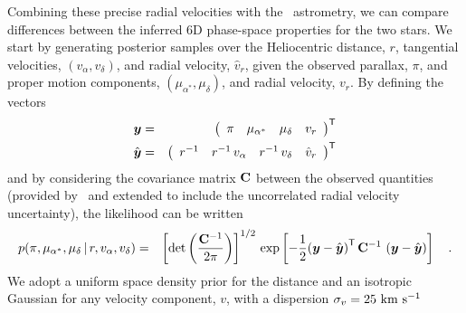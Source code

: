 \documentclass[12pt,letterpaper]{article}
\newcommand{\gaia}{\project{Gaia}}
\newcommand{\tgas}{\acronym{TGAS}}
\begin{document}
Combining these precise radial velocities with the \gaia\ astrometry, we can
compare differences between the inferred 6D phase-space properties for the
two stars.
We start by generating posterior samples over the Heliocentric distance, $r$,
tangential velocities, $(v_\alpha, v_\delta)$, and radial velocity, $\hat{v}_r$,
given the observed parallax, $\pi$, and proper motion components,
$(\mu_{\alpha^*}, \mu_\delta)$, and radial velocity, $v_r$.
By defining the vectors
\begin{eqnarray}
  \vec{y} &=&
      \transpose{\left(
        \begin{array}{c@{\hspace{1em}} c@{\hspace{1em}} c@{\hspace{1em}} c}
          \pi &
          \mu_{\alpha^*} &
          \mu_\delta &
          v_r
        \end{array}
      \right)}\\
  \hat{\vec{y}} &=&
      \transpose{\left(
        \begin{array}{c@{\hspace{1em}} c@{\hspace{1em}} c@{\hspace{1em}} c}
          r^{-1} &
          r^{-1}\,v_\alpha &
          r^{-1}\,v_\delta &
          \hat{v}_r
        \end{array}
      \right)}
\end{eqnarray}
and by considering the covariance matrix $\mathbf{C}$ between the observed
quantities (provided by \tgas\ and extended to include the uncorrelated radial
velocity uncertainty), the likelihood can be written
\begin{eqnarray}
p(\pi, \mu_{\alpha^*}, \mu_\delta \,|\, r, v_\alpha, v_\delta) &=&
  \left[\det\left(\frac{\mathbf{C}^{-1}}{2\pi}\right)\right]^{1/2} \,
    \exp \left[ -\frac{1}{2} {\left(\boldsymbol{y} - \hat{\boldsymbol{y}} \right)}^{\mathsf{T}} \,
    \mathbf{C}^{-1} \,
    \left(\boldsymbol{y} - \hat{\boldsymbol{y}} \right) \right] \label{eq:likefn} \quad .
\end{eqnarray}
We adopt a uniform space density prior for the distance and an isotropic
Gaussian for any velocity component, $v$, with a dispersion $\sigma_v=25~\mathrm{km}~\mathrm{s}^{-1}$
\end{document}
